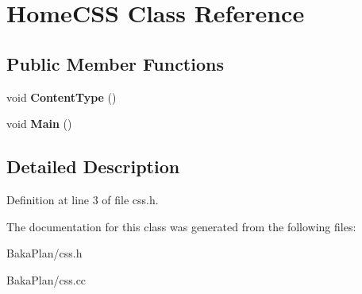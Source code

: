\hypertarget{classHomeCSS}{\section{Home\-C\-S\-S Class Reference}
\label{classHomeCSS}
}
\subsection*{Public Member Functions}
\begin{DoxyCompactItemize}
\item 
\hypertarget{classHomeCSS_a7b0aa561a4b4aee682b9e51d64db1602}{void {\bfseries Content\-Type} ()}\label{classHomeCSS_a7b0aa561a4b4aee682b9e51d64db1602}

\item 
\hypertarget{classHomeCSS_a6b79a31efcc541dd383218288272d6d6}{void {\bfseries Main} ()}\label{classHomeCSS_a6b79a31efcc541dd383218288272d6d6}

\end{DoxyCompactItemize}


\subsection{Detailed Description}


Definition at line 3 of file css.\-h.



The documentation for this class was generated from the following files\-:\begin{DoxyCompactItemize}
\item 
Baka\-Plan/css.\-h\item 
Baka\-Plan/css.\-cc\end{DoxyCompactItemize}
